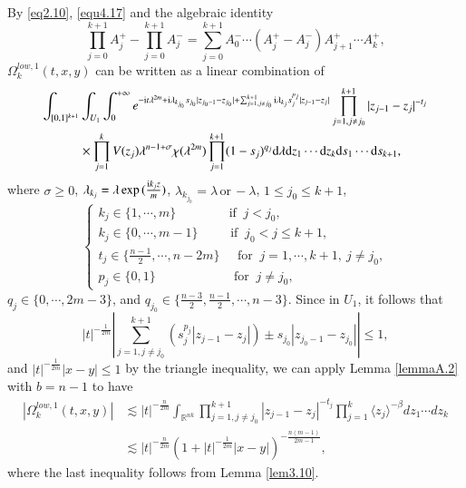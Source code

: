 \documentclass[11pt,reqno]{amsart}
\def\R {\mathbb{R}}
\def\d{{\rm d}}
\def\i{{\rm i}}
\numberwithin{equation}{section}
\theoremstyle{definition}
\begin{document}
By \eqref{eq2.10}, \eqref{equ4.17} and the algebraic identity
$$
\prod_{j=0}^{k+1}A_{j}^{+}-\prod_{j=0}^{k+1}A_{j}^{-}=\sum_{j=0}^{k+1}A_{0}^{-}\cdots(A_{j}^{+}-A_{j}^{-})A_{j+1}^{+}\cdots A_{k}^{+},
$$
$\Omega^{low,1}_{k}(t,x,y)$ can be written as a linear combination of
\begin{equation*}\label{eq4.59}
\begin{split}
	\int_{[0,1]^{k+1}}&\int_{U_1}\int_{0}^{+\infty}e^{-\i t\lambda^{2m}+\i\lambda_{k_{j_{0}}}s_{j_{0}}|z_{j_{0}-1}-z_{j_{0}}|+\sum_{j=1,j\neq j_{0}}^{k+1}\i\lambda_{k_{j}}s_{j}^{p_{j}}|z_{j-1}-z_{j}|}\prod_{j=1,j\neq j_{0}}^{k+1}|z_{j-1}-z_{j}|^{-t_{j}}\\
	&\times\prod_{j=1}^{k}V(z_{j})\lambda^{n-1+\sigma}\chi(\lambda^{2m})\prod_{j=1}^{k+1}(1-s_{j})^{q_{j}}	\d \lambda \d z_1\cdots \d z_k \d s_1\cdots \d s_{k+1},
\end{split}
\end{equation*}
where $\sigma\geqslant0$, $\lambda_{k_{j}}=\lambda \exp{(\frac{\i k_{j}z}{m})}$, $\lambda_{k_{j_{0}}}=\lambda\,\mbox{or}\,-\lambda$, $1\leq j_{0}\leq k+1$, 
\begin{equation*}
\begin{cases}
	k_{j}\in\{1,\cdots,m\} \qquad\,\,\,\,\,  \,\,\,\,\,\,\mbox{ if }\   j<j_{0},\\
	k_{j}\in\{0,\cdots,m-1\} \ \,\,\,\,\, \,\,\,\,\,\,\,\mbox{ if }\   j_{0}<j\leq k+1,\\
	t_{j}\in\{\frac{n-1}{2},\cdots,n-2m\}\ \,\,\,\,\, \mbox{ for }\  j=1,\cdots,k+1,\  j\neq j_{0},\\
	p_{j}\in\{0,1\}\,\,\,\,\,\,\,\,\,\,\,\qquad\qquad  \mbox{ for }\  j\neq j_{0},
\end{cases}
\end{equation*}
$	q_{j}\in\{0,\cdots,2m-3\}$, and $	q_{j_{0}}\in\{\frac{n-3}{2},\frac{n-1}{2},\cdots,n-3\}$.
Since in $U_1$, it follows that
$$|t|^{-\frac{1}{2m}}\left| \sum_{j=1,j\neq j_{0}}^{k+1}(s_{j}^{p_{j}}|z_{j-1}-z_{j}|)\pm s_{j_{0}}|z_{j_{0}-1}-z_{j_{0}}|\right| \leq1,$$
and $|t|^{-\frac{1}{2m}}|x-y|\leq1$ by the triangle inequality, we can apply Lemma \ref{lemmaA.2} with $b=n-1$ to have
\begin{equation*}
\begin{aligned}
	|\Omega^{low,1}_{k}(t,x,y)|&\lesssim |t|^{-\frac{n}{2m}}\int_{\R^{nk}}\prod_{j=1,j\neq j_{0}}^{k+1}|z_{j-1}-z_{j}|^{-t_{j}}\prod_{j=1}^{k}\langle z_{j}\rangle^{-\beta}dz_{1}\cdots dz_{k}\\
	&\lesssim |t|^{-\frac{n}{2m}}\left(1+|t|^{-\frac{1}{2m}}|x-y|\right)^{-\frac{n(m-1)}{2m-1}},
\end{aligned}
\end{equation*}
where the last inequality follows from Lemma  \ref{lem3.10}.
\end{document}

